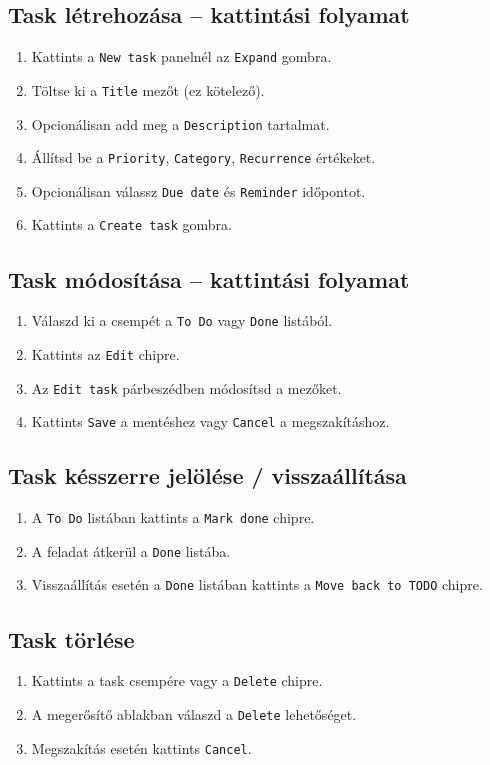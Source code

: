 \documentclass[12pt,a4paper]{article}
\begin{document}
\subsection{Task létrehozása -- kattintási folyamat}
\begin{enumerate}
  \item Kattints a \texttt{New task} panelnél az \texttt{Expand} gombra.
  \item Töltse ki a \texttt{Title} mezőt (ez kötelező).
  \item Opcionálisan add meg a \texttt{Description} tartalmat.
  \item Állítsd be a \texttt{Priority}, \texttt{Category}, \texttt{Recurrence} értékeket.
  \item Opcionálisan válassz \texttt{Due date} és \texttt{Reminder} időpontot.
  \item Kattints a \texttt{Create task} gombra.
\end{enumerate}

\subsection{Task módosítása -- kattintási folyamat}
\begin{enumerate}
  \item Válaszd ki a csempét a \texttt{To Do} vagy \texttt{Done} listából.
  \item Kattints az \texttt{Edit} chipre.
  \item Az \texttt{Edit task} párbeszédben módosítsd a mezőket.
  \item Kattints \texttt{Save} a mentéshez vagy \texttt{Cancel} a megszakításhoz.
\end{enumerate}

\subsection{Task késszerre jelölése / visszaállítása}
\begin{enumerate}
  \item A \texttt{To Do} listában kattints a \texttt{Mark done} chipre.
  \item A feladat átkerül a \texttt{Done} listába.
  \item Visszaállítás esetén a \texttt{Done} listában kattints a \texttt{Move back to TODO} chipre.
\end{enumerate}

\subsection{Task törlése}
\begin{enumerate}
  \item Kattints a task csempére vagy a \texttt{Delete} chipre.
  \item A megerősítő ablakban válaszd a \texttt{Delete} lehetőséget.
  \item Megszakítás esetén kattints \texttt{Cancel}. 
\end{enumerate}
\end{document}
